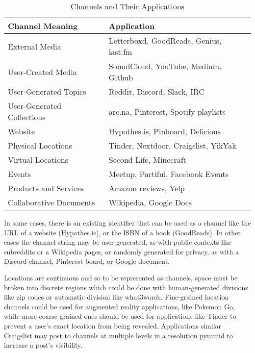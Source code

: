 \begin{table}[h]
    \centering
    \begin{tabular}{|l|l|}
        \hline
        \textbf{Channel Meaning} & \textbf{Application} \\ \hline
        External Media & Letterboxd, GoodReads, Genius, last.fm \\ \hline
        User-Created Media & SoundCloud, YouTube, Medium, Github \\ \hline
        User-Generated Topics & Reddit, Discord, Slack, IRC \\ \hline
        User-Generated Collections & are.na, Pinterest, Spotify playlists \\ \hline
        Website & Hypothes.is, Pinboard, Delicious \\ \hline
        Physical Locations & Tinder, Nextdoor, Craigslist, YikYak \\ \hline
        Virtual Locations & Second Life, Minecraft \\ \hline
        Events & Meetup, Partiful, Facebook Events \\ \hline
        Products and Services & Amazon reviews, Yelp \\ \hline
        Collaborative Documents & Wikipedia, Google Docs \\ \hline
    \end{tabular}
    \caption{Channels and Their Applications}
    \label{concepts:channels-and-applications}
\end{table}

In some cases, there is an existing identifier that can be used as a channel
like the URL of a website (Hypothes.is),
or the ISBN of a book (GoodReads).
In other cases the channel string may be user generated, as with
public contexts like subreddits or a Wikipedia pages,
or randomly generated for privacy, as with
a Discord channel, Pinterest board, or Google document.

Locations are continuous and so to be represented as channels,
space must be broken into discrete regions which could be done with
human-generated divisions like zip codes or automatic division like
what3words. Fine-grained location channels could be used for
augmented reality applications, like Pokemon Go,
while more coarse grained ones should be used for applications like Tinder
to prevent a user's exact location from being revealed.
Applications similar Craigslist may post to channels at multiple levels in
a resolution pyramid to increase a post's visibility.

